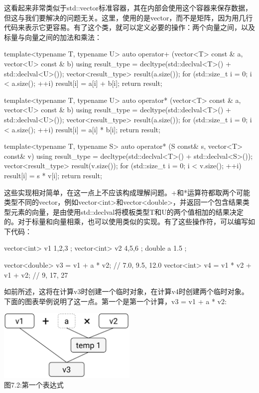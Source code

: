 这看起来非常类似于std::vector标准容器，其在内部会使用这个容器来保存数据，但这与我们要解决的问题无关。这里，使用的是vector，而不是矩阵，因为用几行代码来表示它更容易。有了这个类，就可以定义必要的操作：两个向量之间，以及标量与向量之间的加法和乘法：

\begin{cpp}
template<typename T, typename U>
auto operator+ (vector<T> const & a, vector<U> const & b)
{
	using result_type = decltype(std::declval<T>() +
	std::declval<U>());
	vector<result_type> result(a.size());
	for (std::size_t i = 0; i < a.size(); ++i)
	{
		result[i] = a[i] + b[i];
	}
	return result;
}

template<typename T, typename U>
auto operator* (vector<T> const & a, vector<U> const & b)
{
	using result_type = decltype(std::declval<T>() +
	std::declval<U>());
	vector<result_type> result(a.size());
	for (std::size_t i = 0; i < a.size(); ++i)
	{
		result[i] = a[i] * b[i];
	}
	return result;
}

template<typename T, typename S>
auto operator* (S const& s, vector<T> const& v)
{
	using result_type = decltype(std::declval<T>() +
	std::declval<S>());
	vector<result_type> result(v.size());
	for (std::size_t i = 0; i < v.size(); ++i)
	{
		result[i] = s * v[i];
	}
	return result;
}
\end{cpp}

这些实现相对简单，在这一点上不应该构成理解问题。+和*运算符都取两个可能类型不同的vector，例如vector<int>和vector<double>，并返回一个包含结果类型元素的向量，是由使用std::declval将模板类型T和U的两个值相加的结果决定的。对于标量和向量相乘，也可以使用类似的实现。有了这些操作符，可以编写如下代码：

\begin{cpp}
vector<int> v1{ 1,2,3 };
vector<int> v2{ 4,5,6 };
double a{ 1.5 };

vector<double> v3 = v1 + a * v2; // {7.0, 9.5, 12.0}
vector<int> v4 = v1 * v2 + v1 + v2; // {9, 17, 27}
\end{cpp}

如前所述，这将在计算v3时创建一个临时对象，在计算v4时创建两个临时对象。下面的图表举例说明了这一点。第一个是第一个计算，v3 = v1 + a * v2:

\begin{center}
\includegraphics[width=0.5\textwidth]{images/2.png}\\
图7.2:第一个表达式
\end{center}


